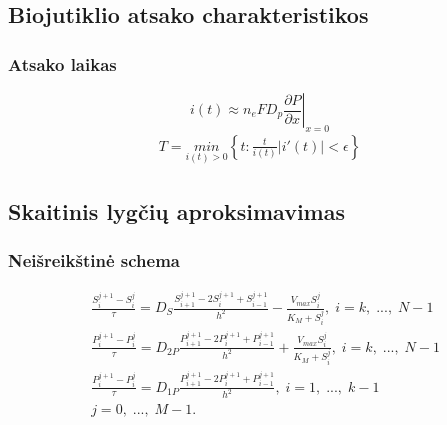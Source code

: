 \documentclass[12pt, a4paper, lithuanian]{article}
\begin{document}
\subsection{Biojutiklio atsako charakteristikos}
\subsubsection{Atsako laikas}
\begin{equation} 
    \left. i(t) \approx n_eFD_p\frac{\partial P}{\partial x} \right|_{x=0}
\end{equation}
\begin{equation} 
\begin{aligned}
    T = \underset{i(t)>0}{min}\left\{t:\frac{t}{i(t)} \left| i'(t)
    \right| < \epsilon \right\}
\end{aligned}
\end{equation}
 
\subsection{Skaitinis lygčių aproksimavimas}
\subsubsection{Neišreikštinė schema}

\begin{equation}
\begin{aligned} 
    &\frac{S_i^{j+1} - S_i^j}{\tau} = D_S\frac{S_{i+1}^{j+1} -
    2S_i^{j+1} + S_{i-1}^{j+1}}{h^2} -
    \frac{V_{max} S_i^j}{K_M + S_i^j},\;i = k,\;...,\;N-1\\ 
    &\frac{P_i^{j+1} - P_i^j}{\tau} = D_{2P}\frac{P_{i+1}^{j+1} -
    2P_i^{j+1} + P_{i-1}^{j+1}}{h^2} +
    \frac{V_{max} S_i^j}{K_M + S_i^j},\;i = k,\;...,\;N-1\\ 
    &\frac{P_i^{j+1} - P_i^j}{\tau} = D_{1P}\frac{P_{i+1}^{j+1} -
    2P_i^{j+1} + P_{i-1}^{j+1}}{h^2}, \;i = 1,\;...,\;k-1\\ 
    &j=0,\;...,\;M-1.
\end{aligned}
\end{equation}
\end{document}
